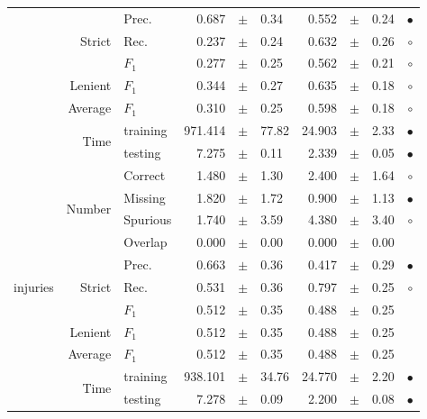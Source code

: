 \begin{longtable}{|r|r|l||rcl|rcl|c|}
\cline{2-10}
  & \multirow{3}{*}{Strict} &  Prec.  & 0.687 &  $\pm$  & 0.34 & 0.552 &  $\pm$  & 0.24 &  $\bullet$\\
\cline{3-10}
  &  &  Rec.  & 0.237 &  $\pm$  & 0.24 & 0.632 &  $\pm$  & 0.26 &  $\circ$\\
\cline{3-10}
  &  &  $F_1$  & 0.277 &  $\pm$  & 0.25 & 0.562 &  $\pm$  & 0.21 &  $\circ$\\
\cline{2-10}
  & Lenient &  $F_1$  & 0.344 &  $\pm$  & 0.27 & 0.635 &  $\pm$  & 0.18 &  $\circ$\\
\cline{2-10}
  & Average &  $F_1$  & 0.310 &  $\pm$  & 0.25 & 0.598 &  $\pm$  & 0.18 &  $\circ$\\
\cline{2-10}
  & \multirow{2}{*}{Time} &  training  & 971.414 &  $\pm$  & 77.82 & 24.903 &  $\pm$  & 2.33 &  $\bullet$\\
\cline{3-10}
  &  &  testing  & 7.275 &  $\pm$  & 0.11 & 2.339 &  $\pm$  & 0.05 &  $\bullet$\\
\hline
\hline
\multirow{11}{*}{\begin{sideways}injuries\end{sideways} } & \multirow{4}{*}{Number} &  Correct  & 1.480 &  $\pm$  & 1.30 & 2.400 &  $\pm$  & 1.64 &  $\circ$\\
\cline{3-10}
  &  &  Missing  & 1.820 &  $\pm$  & 1.72 & 0.900 &  $\pm$  & 1.13 &  $\bullet$\\
\cline{3-10}
  &  &  Spurious  & 1.740 &  $\pm$  & 3.59 & 4.380 &  $\pm$  & 3.40 &  $\circ$\\
\cline{3-10}
  &  &  Overlap  & 0.000 &  $\pm$  & 0.00 & 0.000 &  $\pm$  & 0.00 &   \\
\cline{2-10}
  & \multirow{3}{*}{Strict} &  Prec.  & 0.663 &  $\pm$  & 0.36 & 0.417 &  $\pm$  & 0.29 &  $\bullet$\\
\cline{3-10}
  &  &  Rec.  & 0.531 &  $\pm$  & 0.36 & 0.797 &  $\pm$  & 0.25 &  $\circ$\\
\cline{3-10}
  &  &  $F_1$  & 0.512 &  $\pm$  & 0.35 & 0.488 &  $\pm$  & 0.25 &   \\
\cline{2-10}
  & Lenient &  $F_1$  & 0.512 &  $\pm$  & 0.35 & 0.488 &  $\pm$  & 0.25 &   \\
\cline{2-10}
  & Average &  $F_1$  & 0.512 &  $\pm$  & 0.35 & 0.488 &  $\pm$  & 0.25 &   \\
\cline{2-10}
  & \multirow{2}{*}{Time} &  training  & 938.101 &  $\pm$  & 34.76 & 24.770 &  $\pm$  & 2.20 &  $\bullet$\\
\cline{3-10}
  &  &  testing  & 7.278 &  $\pm$  & 0.09 & 2.200 &  $\pm$  & 0.08 &  $\bullet$\\

\end{longtable}

